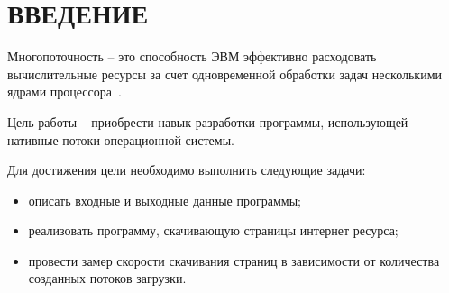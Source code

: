 \chapter*{ВВЕДЕНИЕ}

Многопоточность -- это способность ЭВМ эффективно расходовать вычислительные ресурсы за счет одновременной обработки задач несколькими ядрами процессора~\cite{book_unix}. 

Цель работы -- приобрести навык разработки программы, использующей нативные потоки операционной системы. 

Для достижения цели необходимо выполнить следующие задачи:
\begin{itemize}[label=--]
    \item описать входные и выходные данные программы;
    \item реализовать программу, скачивающую страницы интернет ресурса;
    \item провести замер скорости скачивания страниц в зависимости от количества созданных потоков загрузки. 
\end{itemize}
